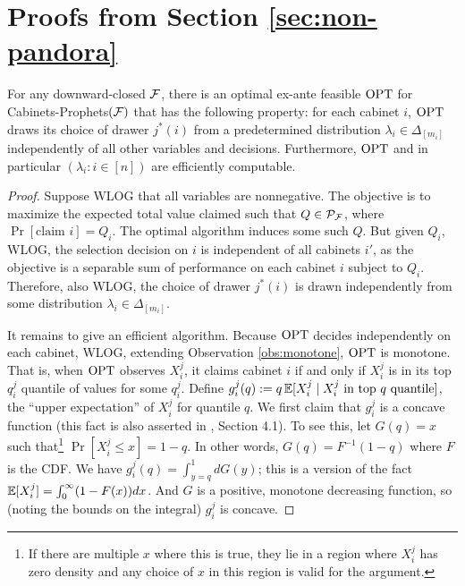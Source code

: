 \section{Proofs from Section \ref{sec:non-pandora}} \label{app:non-pandora}

\begin{lemma} \label{lemma:cabinets-nonadaptive-opt}
  For any downward-closed $\mathcal{F}$, there is an optimal ex-ante feasible $\mathrm{OPT}$ for Cabinets-Prophets$(\mathcal{F})$ that has the following property: for each cabinet $i$, $\mathrm{OPT}$ draws its choice of drawer $j^*(i)$ from a predetermined distribution $\lambda_i \in \Delta_{[m_i]}$ independently of all other variables and decisions.
  Furthermore, $\mathrm{OPT}$ and in particular $(\lambda_i : i \in [n])$ are efficiently computable.
\end{lemma}
\begin{proof}
  Suppose WLOG that all variables are nonnegative.
  The objective is to maximize the expected total value claimed such that $Q \in \mathcal{P}_{\mathcal{F}}$, where $\Pr[\text{claim $i$}] = Q_i$.
  The optimal algorithm induces some such $Q$.
  But given $Q_i$,  WLOG, the selection decision on $i$ is independent of all cabinets $i'$, as the objective is a separable sum of performance on each cabinet $i$ subject to $Q_i$.
  Therefore, also WLOG, the choice of drawer $j^*(i)$ is drawn independently from some distribution $\lambda_i \in \Delta_{[m_i]}$.

  It remains to give an efficient algorithm.
  Because $\mathrm{OPT}$ decides independently on each cabinet, WLOG, extending Observation \ref{obs:monotone}, $\mathrm{OPT}$ is monotone.
  That is, when $\mathrm{OPT}$ observes $X_i^j$, it claims cabinet $i$ if and only if $X_i^j$ is in its top $q_i^j$ quantile of values for some $q_i^j$.
  Define $g_i^j(q) := q \operatorname*{\mathbb{E}}[ X_i^j \mid \text{$X_i^j$ in top $q$ quantile} ]$, the ``upper expectation'' of $X_i^j$ for quantile $q$.
  We first claim that $g_i^j$ is a concave function (this fact is also asserted in \citet{feldman2016online}, Section 4.1).
  To see this, let $G(q) = x$ such that\footnote{If there are multiple $x$ where this is true, they lie in a region where $X_i^j$ has zero density and any choice of $x$ in this region is valid for the argument.} $\Pr[X_i^j \leq x] = 1-q$.
  In other words, $G(q) = F^{-1}(1-q)$ where $F$ is the CDF.
  We have $g_i^j(q) = \int_{y=q}^1 dG(y)$; this is a version of the fact $\operatorname*{\mathbb{E}}[X_i^j] = \int_0^{\infty} (1 - F(x)) dx$.
  And $G$ is a positive, monotone decreasing function, so (noting the bounds on the integral) $g_i^j$ is concave.


\end{proof}
